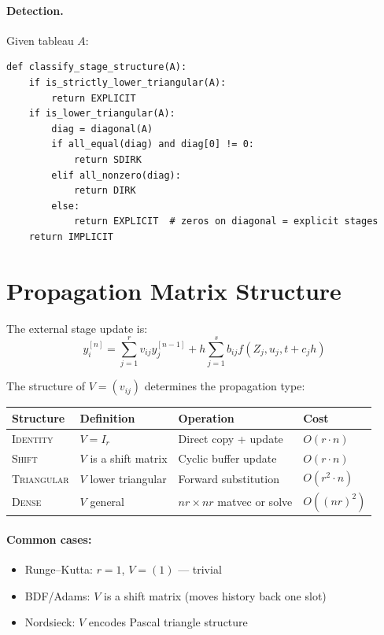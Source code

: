 \documentclass[11pt]{article}
\begin{document}
\paragraph{Detection.} Given tableau $A$:
\begin{verbatim}
def classify_stage_structure(A):
    if is_strictly_lower_triangular(A):
        return EXPLICIT
    if is_lower_triangular(A):
        diag = diagonal(A)
        if all_equal(diag) and diag[0] != 0:
            return SDIRK
        elif all_nonzero(diag):
            return DIRK
        else:
            return EXPLICIT  # zeros on diagonal = explicit stages
    return IMPLICIT
\end{verbatim}

\section{Propagation Matrix Structure}

The external stage update is:
\[
y_i^{[n]} = \sum_{j=1}^r v_{ij} y_j^{[n-1]} + h\sum_{j=1}^s b_{ij} f(Z_j, u_j, t+c_jh)
\]

The structure of $V = (v_{ij})$ determines the propagation type:

\begin{center}
\begin{tabular}{llll}
\toprule
Structure & Definition & Operation & Cost \\
\midrule
\textsc{Identity} & $V = I_r$ & Direct copy + update & $O(r \cdot n)$ \\
\textsc{Shift} & $V$ is a shift matrix & Cyclic buffer update & $O(r \cdot n)$ \\
\textsc{Triangular} & $V$ lower triangular & Forward substitution & $O(r^2 \cdot n)$ \\
\textsc{Dense} & $V$ general & $nr \times nr$ matvec or solve & $O((nr)^2)$ \\
\bottomrule
\end{tabular}
\end{center}

\paragraph{Common cases:}
\begin{itemize}[nosep]
\item Runge--Kutta: $r=1$, $V = (1)$ — trivial
\item BDF/Adams: $V$ is a shift matrix (moves history back one slot)
\item Nordsieck: $V$ encodes Pascal triangle structure
\end{itemize}
\end{document}
